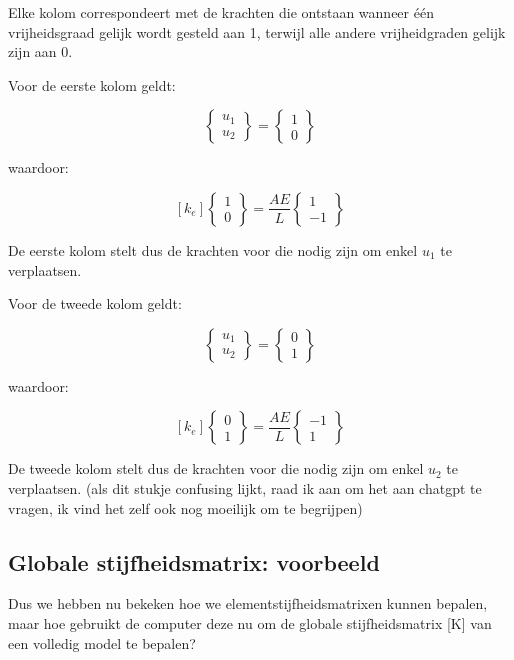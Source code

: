 \documentclass[a4paper,11pt,twoside]{report}
\begin{document}
Elke kolom correspondeert met de krachten die ontstaan wanneer één vrijheidsgraad gelijk wordt
gesteld aan 1, terwijl alle andere vrijheidgraden gelijk zijn aan 0.

Voor de eerste kolom geldt:

\[
    \begin{Bmatrix}
        u_1 \\
        u_2
    \end{Bmatrix}
    =
    \begin{Bmatrix}
        1 \\
        0
    \end{Bmatrix}
\]

waardoor:

\[
    [k_e]
    \begin{Bmatrix}
        1 \\
        0
    \end{Bmatrix}
    =
    \frac{AE}{L}
    \begin{Bmatrix}
        1 \\
        -1
    \end{Bmatrix}
\]

De eerste kolom stelt dus de krachten voor die nodig zijn om enkel \(u_1\) te verplaatsen.

Voor de tweede kolom geldt:

\[
    \begin{Bmatrix}
        u_1 \\
        u_2
    \end{Bmatrix}
    =
    \begin{Bmatrix}
        0 \\
        1
    \end{Bmatrix}
\]

waardoor:

\[
    [k_e]
    \begin{Bmatrix}
        0 \\
        1
    \end{Bmatrix}
    =
    \frac{AE}{L}
    \begin{Bmatrix}
        -1 \\
        1
    \end{Bmatrix}
\]

De tweede kolom stelt dus de krachten voor die nodig zijn om enkel \(u_2\) te verplaatsen.
\newline
(als dit stukje confusing lijkt, raad ik aan om het aan chatgpt te vragen, ik vind het zelf ook nog
moeilijk om te begrijpen)
\subsection{Globale stijfheidsmatrix: voorbeeld}
Dus we hebben nu bekeken hoe we elementstijfheidsmatrixen kunnen bepalen, maar hoe gebruikt de
computer deze nu om de globale stijfheidsmatrix [K] van een volledig model te bepalen?
\end{document}
